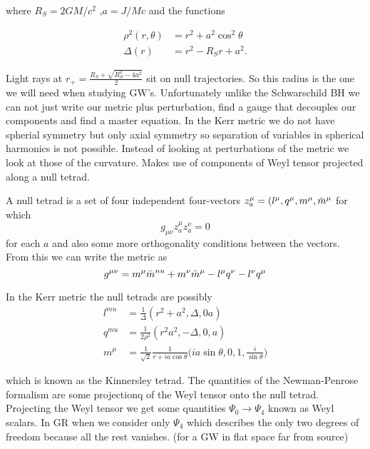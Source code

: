\documentclass[12 pt]{article}
\begin{document}
	where $R_S = 2GM/c^2$ ,$a = J/Mc$ and the functions 
	
	\begin{align}
		\rho^2(r,\theta) &= r^2 +a^2 \cos^2 \theta \\
		\Delta(r) &= r^2 - R_S r + a^2.
	\end{align}
	
	Light rays at $r_+ = \frac{R_S +\sqrt{R_S^2 - 4a^2}}{2} $ sit on null trajectories. So this radius is the one we will need when studying GW's.
	Unfortunately unlike the Schwarschild BH we can not just write our metric plus perturbation, find a gauge that decouples our components and find a master equation. In the Kerr metric we do not have spherial symmetry but only axial symmetry so separation of variables in spherical harmonics is not possible. Instead of looking at perturbations of the metric we look at those of the curvature. Makes use of components of Weyl tensor projected along a null tetrad.
	
	A null tetrad is a set of four independent four-vectors $z_a^{\mu} = (l^{\mu}, q^{\mu},m^{\mu},\Bar{m}^{\mu}$ for which 
	\begin{equation}
		g_{\mu \nu}z_a^{\mu}z_a^{\nu} = 0
	\end{equation}
	for each $a$ and also some more orthogonality conditions between the vectors. From this we can write the metric as
	\begin{equation}
		g^{\mu \nu} = m^{\mu} \Bar{m}^{nu} + m^{\nu} \Bar{m}^{\mu} - l^{\mu} q^{\nu} - l^{\nu} q^{\mu}
	\end{equation}
	
	In the Kerr metric the null tetrads are possibly
	\begin{align}
		l^{mu} &= \frac{1}{\Delta}  (r^2 +a^2, \Delta ,0 a) \\
		q^{mu} &= \frac{1}{2\rho^2}  (r^2 a^2, -\Delta, 0,a) \\
		m^{\mu} &= \frac{1}{\sqrt{2}} \frac{1}{r+i a \cos \theta}\Big( ia \sin \theta,0,1,\frac{i}{\sin \theta} \Big)
	\end{align}
	
	which is known as the Kinnersley tetrad. The quantities of the Newman-Penrose formalism are some projectionq of the Weyl tensor onto the null tetrad. Projecting the Weyl tensor we get some quantities $\Psi_0 \longrightarrow \Psi_4$ known as Weyl scalars. In GR when we consider only $\Psi_4$ which describes the only two degrees of freedom because all the rest vanishes. (for a GW in flat space far from source)
	
\end{document}
